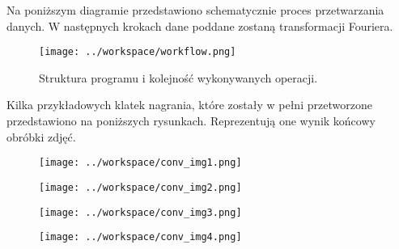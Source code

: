 \documentclass[a4paper,11pt,twoside,openright]{article} %
\begin{document}
\vspace{8mm}
\noindent Na poniższym diagramie przedstawiono schematycznie proces przetwarzania danych. W następnych krokach dane poddane zostaną transformacji Fouriera.
\captionsetup{skip=0pt}
\begin{figure}[!h]
\captionsetup{justification=centering}
\begin{center}
\texttt{[image: ../workspace/workflow.png]} 
\end{center}
\caption{Struktura programu i kolejność wykonywanych operacji.}
\label{fig:deg5_diff}
\end{figure} 



\newpage
\noindent Kilka przykładowych klatek nagrania, które zostały w pełni przetworzone przedstawiono na poniższych rysunkach. Reprezentują one wynik końcowy obróbki zdjęć. 

\captionsetup{skip=0pt}
 \begin{centering}
\begin{minipage}{0.5\textwidth}
\begin{figure}[H]
\captionsetup{justification=centering}
\begin{center}
\texttt{[image: ../workspace/conv\_img1.png]} 
\end{center}
\end{figure}
\end{minipage}
  \begin{minipage}{0.5\textwidth}
\begin{figure}[H]
\captionsetup{justification=centering}
\begin{center}
\texttt{[image: ../workspace/conv\_img2.png]} 
\end{center}
\end{figure}
\end{minipage} \hfill
\end{centering}


\captionsetup{skip=0pt}
 \begin{centering}
\begin{minipage}{0.5\textwidth}
\begin{figure}[H]
\captionsetup{justification=centering}
\begin{center}
\texttt{[image: ../workspace/conv\_img3.png]} 
\end{center}
\end{figure}
\end{minipage}
  \begin{minipage}{0.5\textwidth}
\begin{figure}[H]
\captionsetup{justification=centering}
\begin{center}
\texttt{[image: ../workspace/conv\_img4.png]} 
\end{center}
\end{figure}
\end{minipage} \hfill
\end{centering}
\end{document}
